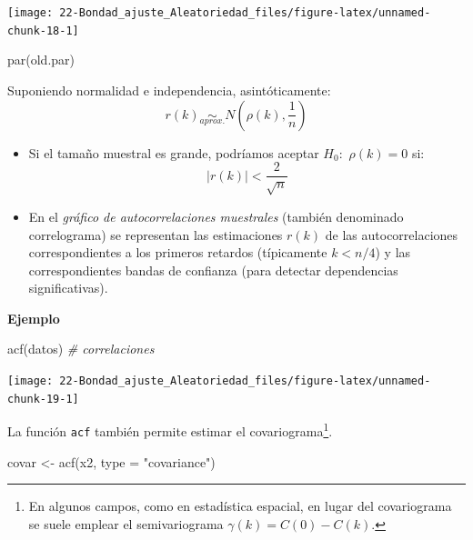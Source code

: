 \documentclass[
]{book}
\newenvironment{Shaded}{\begin{snugshade}}{\end{snugshade}}
\newcommand{\AttributeTok}[1]{\textcolor[rgb]{0.77,0.63,0.00}{#1}}
\newcommand{\CommentTok}[1]{\textcolor[rgb]{0.56,0.35,0.01}{\textit{#1}}}
\newcommand{\FunctionTok}[1]{\textcolor[rgb]{0.00,0.00,0.00}{#1}}
\newcommand{\NormalTok}[1]{#1}
\newcommand{\OtherTok}[1]{\textcolor[rgb]{0.56,0.35,0.01}{#1}}
\newcommand{\StringTok}[1]{\textcolor[rgb]{0.31,0.60,0.02}{#1}}
\theoremstyle{break}
\theoremstyle{nonumberplain}
\begin{document}
\begin{center}\texttt{[image: 22-Bondad\_ajuste\_Aleatoriedad\_files/figure-latex/unnamed-chunk-18-1]} \end{center}

\begin{Shaded}
\begin{Highlighting}[]
\FunctionTok{par}\NormalTok{(old.par)}
\end{Highlighting}
\end{Shaded}

Suponiendo normalidad e independencia, asintóticamente:
\[r(k)\underset{aprox.}{\sim}N\left(  \rho(k),\frac{1}{n}\right)\]

\begin{itemize}
\item
  Si el tamaño muestral es grande, podríamos aceptar \(H_{0}:\)
  \(\rho\left( k\right) = 0\) si:\[|r(k)|<\dfrac{2}{\sqrt{n}}\]
\item
  En el \emph{gráfico de autocorrelaciones muestrales} (también
  denominado correlograma) se representan las estimaciones \(r(k)\)
  de las autocorrelaciones correspondientes a los primeros retardos
  (típicamente \(k<n/4\)) y las correspondientes bandas de confianza
  (para detectar dependencias significativas).
\end{itemize}

\textbf{Ejemplo}

\begin{Shaded}
\begin{Highlighting}[]
\FunctionTok{acf}\NormalTok{(datos)  }\CommentTok{\# correlaciones}
\end{Highlighting}
\end{Shaded}

\begin{center}\texttt{[image: 22-Bondad\_ajuste\_Aleatoriedad\_files/figure-latex/unnamed-chunk-19-1]} \end{center}

La función \texttt{acf} también permite estimar el covariograma\footnote{En algunos campos, como en estadística espacial, en lugar del covariograma se suele emplear el semivariograma \(\gamma(k) = C(0) - C(k)\).}.

\begin{Shaded}
\begin{Highlighting}[]
\NormalTok{covar }\OtherTok{\textless{}{-}} \FunctionTok{acf}\NormalTok{(x2, }\AttributeTok{type =} \StringTok{"covariance"}\NormalTok{)}
\end{Highlighting}
\end{Shaded}
\end{document}
